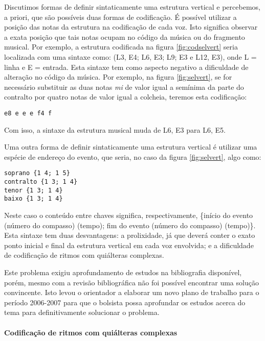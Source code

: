 \documentclass[11pt]{article}
\begin{document}
Discutimos formas de definir sintaticamente uma estrutura vertical e
percebemos, a priori, que são possíveis duas formas de codificação.  É
possível utilizar a posição das notas da estrutura na codificação de
cada voz. Isto significa observar a exata posição que tais notas
ocupam no código da música ou do fragmento musical. Por exemplo, a
estrutura codificada na figura \ref{fig:codselvert} seria localizada
com uma sintaxe como: (L3, E4; L6, E3; L9; E3 e L12, E3), onde L =
linha e E = entrada. Esta sintaxe tem como aspecto negativo a
dificuldade de alteração no código da música. Por exemplo, na figura
\ref{fig:selvert}, se for necessário substituir as duas notas
\textit{mi} de valor igual a semínima da parte do contralto por quatro
notas de valor igual a colcheia, teremos esta codificação:

\begin{verbatim}
e8 e e e f4 f
\end{verbatim}

Com isso, a sintaxe da estrutura musical muda de L6, E3 para L6, E5.

Uma outra forma de definir sintaticamente uma estrutura vertical é
utilizar uma espécie de endereço do evento, que seria, no caso da
figura \ref{fig:selvert}, algo como:

\begin{verbatim}
soprano {1 4; 1 5}
contralto {1 3; 1 4}
tenor {1 3; 1 4}
baixo {1 3; 1 4}
\end{verbatim}

Neste caso o conteúdo entre chaves significa, respectivamente,
\{início do evento (número do compasso) (tempo); fim do evento (número
do compasso) (tempo)\}. Esta sintaxe tem duas desvantagens: a
prolixidade, já que deverá conter o exato ponto inicial e final da
estrutura vertical em cada voz envolvida; e a dificuldade de
codificação de ritmos com quiálteras complexas.

Este problema exigiu aprofundamento de estudos na bibliografia
disponível, porém, mesmo com a revisão bibliográfica não foi possível
encontrar uma solução convincente. Isto levou o orientador a elaborar
um novo plano de trabalho para o período 2006-2007 para que o bolsista
possa aprofundar os estudos acerca do tema para definitivamente
solucionar o problema.

\paragraph{Codificação de ritmos com quiálteras complexas}
\label{sec:codif-de-ritm}
\end{document}
